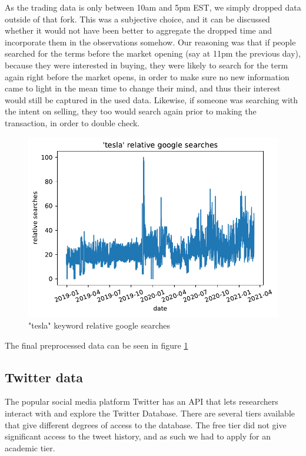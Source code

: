 As the trading data is only between 10am and 5pm EST, we simply dropped data outside of that fork. This was a subjective choice, and it can be discussed whether it would not have been better to aggregate the dropped time and incorporate them in the observations somehow. Our reasoning was that if people searched for the terms before the market opening (say at 11pm the previous day), because they were interested in buying, they were likely to search for the term again right before the market opens, in order to make sure no new information came to light in the mean time to change their mind, and thus their interest would still be captured in the used data. Likewise, if someone was searching with the intent on selling, they too would search again prior to making the transaction, in order to double check.

\begin{figure}[h]
	\centering
	\includegraphics[width=\textwidth]{img/img_GT_tesla.pdf}
	\caption{"tesla" keyword relative google searches}
	\label{fig:GT_tesla}
\end{figure}

The final preprocessed data can be seen in figure \ref{fig:GT_tesla}

\subsection{Twitter data}
The popular social media platform Twitter has an \Gls{API} that lets researchers interact with and explore the Twitter Database. There are several tiers available that give different degrees of access to the database. The free tier did not give significant access to the tweet history, and as such we had to apply for an academic tier.

